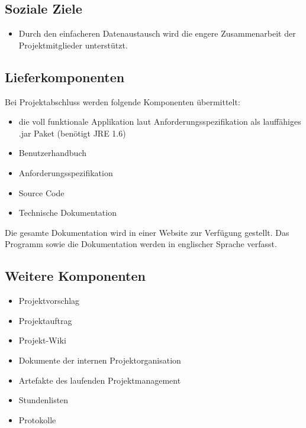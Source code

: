 \subsection{Soziale Ziele}
\begin{itemize}
\item Durch den einfacheren Datenaustausch wird die engere Zusammenarbeit der Projektmitglieder unterstützt.
\end{itemize}

\subsection{Lieferkomponenten}
Bei Projektabschluss werden folgende Komponenten übermittelt:
\begin{itemize}
\item die voll funktionale Applikation laut Anforderungsspezifikation als lauffähiges .jar Paket (benötigt JRE 1.6)
\item Benutzerhandbuch
\item Anforderungsspezifikation
\item Source Code
\item Technische Dokumentation
\end{itemize}

Die gesamte Dokumentation wird in einer Website zur Verfügung gestellt. Das Programm sowie die Dokumentation werden in englischer Sprache verfasst.

\subsection{Weitere Komponenten}
\begin{itemize}
\item Projektvorschlag
\item Projektauftrag
\item Projekt-Wiki
\item Dokumente der internen Projektorganisation
\item Artefakte des laufenden Projektmanagement
\item Stundenlisten
\item Protokolle
\end{itemize}
